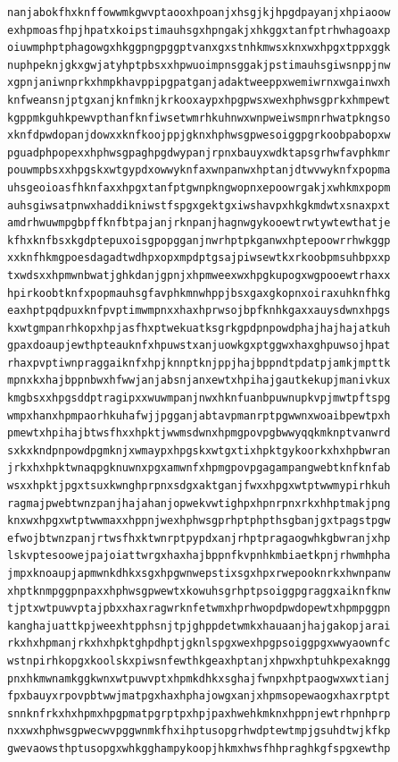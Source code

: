 \documentclass[11pt,letterpaper]{exam}
\begin{document}
\begin{questions}
\begin{verbatim}
nanjabokfhxknffowwmkgwvptaooxhpoanjxhsgjkjhpgdpayanjxhpiaoow
exhpmoasfhpjhpatxkoipstimauhsgxhpngakjxhkggxtanfptrhwhagoaxp
oiuwmphptphagowgxhkggpngpggptvanxgxstnhkmwsxknxwxhpgxtppxggk
nuphpeknjgkxgwjatyhptpbsxxhpwuoimpnsggakjpstimauhsgiwsnppjnw
xgpnjaniwnprkxhmpkhavppipgpatganjadaktweeppxwemiwrnxwgainwxh
knfweansnjptgxanjknfmknjkrkooxaypxhpgpwsxwexhphwsgprkxhmpewt
kgppmkguhkpewvpthanfknfiwsetwmrhkuhnwxwnpweiwsmpnrhwatpkngso
xknfdpwdopanjdowxxknfkoojppjgknxhphwsgpwesoiggpgrkoobpabopxw
pguadphpopexxhphwsgpaghpgdwypanjrpnxbauyxwdktapsgrhwfavphkmr
pouwmpbsxxhpgskxwtgypdxowwyknfaxwnpanwxhptanjdtwvwyknfxpopma
uhsgeoioasfhknfaxxhpgxtanfptgwnpkngwopnxepoowrgakjxwhkmxpopm
auhsgiwsatpnwxhaddikniwstfspgxgektgxiwshavpxhkgkmdwtxsnaxpxt
amdrhwuwmpgbpffknfbtpajanjrknpanjhagnwgykooewtrwtywtewthatje
kfhxknfbsxkgdptepuxoisgpopgganjnwrhptpkganwxhptepoowrrhwkggp
xxknfhkmgpoesdagadtwdhpxopxmpdptgsajpiwsewtkxrkoobpmsuhbpxxp
txwdsxxhpmwnbwatjghkdanjgpnjxhpmweexwxhpgkupogxwgpooewtrhaxx
hpirkoobtknfxpopmauhsgfavphkmnwhppjbsxgaxgkopnxoiraxuhknfhkg
eaxhptpqdpuxknfpvptimwmpnxxhaxhprwsojbpfknhkgaxxauysdwnxhpgs
kxwtgmpanrhkopxhpjasfhxptwekuatksgrkgpdpnpowdphajhajhajatkuh
gpaxdoaupjewthpteauknfxhpuwstxanjuowkgxptggwxhaxghpuwsojhpat
rhaxpvptiwnpraggaiknfxhpjknnptknjppjhajbppndtpdatpjamkjmpttk
mpnxkxhajbppnbwxhfwwjanjabsnjanxewtxhpihajgautkekupjmanivkux
kmgbsxxhpgsddptragipxxwuwmpanjnwxhknfuanbpuwnupkvpjmwtpftspg
wmpxhanxhpmpaorhkuhafwjjpgganjabtavpmanrptpgwwnxwoaibpewtpxh
pmewtxhpihajbtwsfhxxhpktjwwmsdwnxhpmgpovpgbwwyqqkmknptvanwrd
sxkxkndpnpowdpgmknjxwmaypxhpgskxwtgxtixhpktgykoorkxhxhpbwran
jrkxhxhpktwnaqpgknuwnxpgxamwnfxhpmgpovpgagampangwebtknfknfab
wsxxhpktjpgxtsuxkwnghprpnxsdgxaktganjfwxxhpgxwtptwwmypirhkuh
ragmajpwebtwnzpanjhajahanjopwekvwtighpxhpnrpnxrkxhhptmakjpng
knxwxhpgxwtptwwmaxxhppnjwexhphwsgprhptphpthsgbanjgxtpagstpgw
efwojbtwnzpanjrtwsfhxktwnrptpypdxanjrhptpragaogwhkgbwranjxhp
lskvptesoowejpajoiattwrgxhaxhajbppnfkvpnhkmbiaetkpnjrhwmhpha
jmpxknoaupjapmwnkdhkxsgxhpgwnwepstixsgxhpxrwepooknrkxhwnpanw
xhptknmpggpnpaxxhphwsgpwewtxkowuhsgrhptpsoiggpgraggxaiknfknw
tjptxwtpuwvptajpbxxhaxragwrknfetwmxhprhwopdpwdopewtxhpmpggpn
kanghajuattkpjweexhtpphsnjtpjghppdetwmkxhauaanjhajgakopjarai
rkxhxhpmanjrkxhxhpktghpdhptjgknlspgxwexhpgpsoiggpgxwwyaownfc
wstnpirhkopgxkoolskxpiwsnfewthkgeaxhptanjxhpwxhptuhkpexakngg
pnxhkmwnamkggkwnxwtpuwvptxhpmkdhkxsghajfwnpxhptpaogwxwxtianj
fpxbauyxrpovpbtwwjmatpgxhaxhphajowgxanjxhpmsopewaogxhaxrptpt
snnknfrkxhxhpmxhpgpmatpgrptpxhpjpaxhwehkmknxhppnjewtrhpnhprp
nxxwxhphwsgpwecwvpggwnmkfhxihptusopgrhwdptewtmpjgsuhdtwjkfkp
gwevaowsthptusopgxwhkgghampykoopjhkmxhwsfhhpraghkgfspgxewthp

\end{verbatim}
\end{questions}
\end{document}
